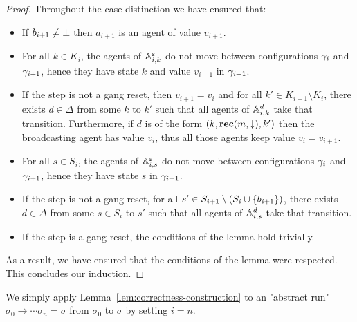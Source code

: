 \begin{proof}
	Throughout the case distinction we have ensured that:
	\begin{itemize}
		\item If $b_{i+1} \neq \bot$ then $a_{i+1}$ is an agent of value $v_{i+1}$.
		
		\item For all $k \in K_{i}$, the agents of $\mathbb{A}_{i,k}^\varepsilon$ do not move between configurations $\gamma_{i}$ and $\gamma_{i+1}$, hence they have state $k$ and value $v_{i+1}$ in $\gamma_{i+1}$.
		
		\item If the step is not a gang reset, then $v_{i+1} = v_i$ and for all $k' \in K_{i+1} \setminus K_i$, there exists $d \in \Delta$ from some $k$ to $k'$ such that all agents of $\mathbb{A}_{i,k}^d$ take that transition. Furthermore, if $d$ is of the form $(k,\textbf{rec}(m, \downarrow),k')$ then the broadcasting agent has value $v_i$, thus all those agents keep value $v_i = v_{i+1}$. 
		
		\item For all $s \in S_{i}$, the agents of $\mathbb{A}_{i,s}^\varepsilon$ do not move between configurations $\gamma_{i}$ and $\gamma_{i+1}$, hence they have state $s$ in $\gamma_{i+1}$.
		
		\item If the step is not a gang reset, for all $s' \in S_{i+1} \setminus (S_i \cup \{b_{i+1}\})$, there exists $d \in \Delta$ from some $s \in S_i$ to $s'$ such that all agents of $\mathbb{A}_{i,s}^d$ take that transition.
		
		\item If the step is a gang reset, the conditions of the lemma hold trivially.
	\end{itemize}
	
	As a result, we have ensured that the conditions of the lemma were respected.
	This concludes our induction.
\end{proof}


	We simply apply Lemma~\ref{lem:correctness-construction} to an "abstract run" $\sigma_0 \to \cdots \sigma_n = \sigma$ from $\sigma_0$ to $\sigma$ by setting $i = n$.

